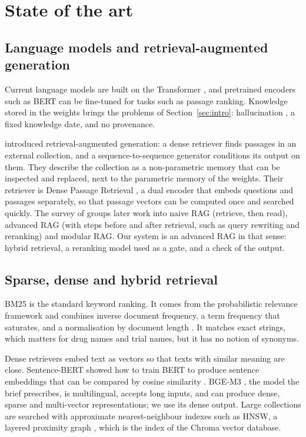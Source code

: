 \section{State of the art}
\label{sec:related}

\subsection{Language models and retrieval-augmented generation}

Current language models are built on the Transformer \citep{vaswani2017attention}, and pretrained encoders such as BERT \citep{devlin2019bert} can be fine-tuned for tasks such as passage ranking. Knowledge stored in the weights brings the problems of Section~\ref{sec:intro}: hallucination \citep{ji2023hallucination}, a fixed knowledge date, and no provenance.

\citet{lewis2020rag} introduced retrieval-augmented generation: a dense retriever finds passages in an external collection, and a sequence-to-sequence generator conditions its output on them. They describe the collection as a non-parametric memory that can be inspected and replaced, next to the parametric memory of the weights. Their retriever is Dense Passage Retrieval \citep{karpukhin2020dpr}, a dual encoder that embeds questions and passages separately, so that passage vectors can be computed once and searched quickly. The survey of \citet{gao2023ragsurvey} groups later work into naive RAG (retrieve, then read), advanced RAG (with steps before and after retrieval, such as query rewriting and reranking) and modular RAG. Our system is an advanced RAG in that sense: hybrid retrieval, a reranking model used as a gate, and a check of the output.

\subsection{Sparse, dense and hybrid retrieval}

BM25 is the standard keyword ranking. It comes from the probabilistic relevance framework and combines inverse document frequency, a term frequency that saturates, and a normalisation by document length \citep{robertson2009bm25}. It matches exact strings, which matters for drug names and trial names, but it has no notion of synonyms.

Dense retrievers embed text as vectors so that texts with similar meaning are close. Sentence-BERT showed how to train BERT to produce sentence embeddings that can be compared by cosine similarity \citep{reimers2019sbert}. BGE-M3 \citep{chen2024bgem3}, the model the brief prescribes, is multilingual, accepts long inputs, and can produce dense, sparse and multi-vector representations; we use its dense output. Large collections are searched with approximate nearest-neighbour indexes such as HNSW, a layered proximity graph \citep{malkov2020hnsw}, which is the index of the Chroma vector database.

